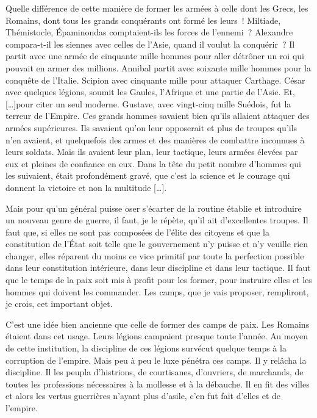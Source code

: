 \documentclass[french,twoside]{book} %
\begin{document}
Quelle différence de cette manière de former les armées à celle dont les Grecs, les Romains, dont tous les grands conquérants ont formé les leurs ! Miltiade, Thémistocle, Épaminondas comptaient-ils les forces de l’ennemi ? Alexandre compara-t-il les siennes avec celles de l’Asie, quand il voulut la conquérir ? Il partit avec une armée de cinquante mille hommes pour aller détrôner un roi qui pouvait en armer des millions. Annibal partit avec soixante mille hommes pour la conquête de l’Italie. Scipion avec cinquante mille pour attaquer Carthage. César avec quelques légions, soumit les Gaules, l’Afrique et une partie de l’Asie. Et, […]pour citer un seul moderne. Gustave, avec vingt-cinq mille Suédois, fut la terreur de l’Empire. Ces grands hommes savaient bien qu’ils allaient attaquer des armées supérieures. Ils savaient qu’on leur opposerait et plus de troupes qu’ils n’en avaient, et quelquefois des armes et des manières de combattre inconnues à leurs soldats. Mais ils avaient leur plan, leur tactique, leurs armées élevées par eux et pleines de confiance en eux. Dans la tête du petit nombre d’hommes qui les suivaient, était profondément gravé, que c’est la science et le courage qui donnent la victoire et non la multitude […].\par
Mais pour qu’un général puisse oser s’écarter de la routine établie et introduire un nouveau genre de guerre, il faut, je le répète, qu’il ait d’excellentes troupes. Il faut que, si elles ne sont pas composées de l’élite des citoyens et que la constitution de l’État soit telle que le gouvernement n’y puisse et n’y veuille rien changer, elles réparent du moins ce vice primitif par toute la perfection possible dans leur constitution intérieure, dans leur discipline et dans leur tactique. Il faut que le temps de la paix soit mis à profit pour les former, pour instruire elles et les hommes qui doivent les commander. Les camps, que je vais proposer, rempliront, je crois, cet important objet.\par
C’est une idée bien ancienne que celle de former des camps de paix. Les Romains étaient dans cet usage. Leurs légions campaient presque toute l’année. Au moyen de cette institution, la discipline de ces légions survécut quelque temps à la corruption de l’empire. Mais peu à peu le luxe pénétra ces camps. Il y relâcha la discipline. Il les peupla d’histrions, de courtisanes, d’ouvriers, de marchands, de toutes les professions nécessaires à la mollesse et à la débauche. Il en fit des villes et alors les vertus guerrières n’ayant plus d’asile, c’en fut fait d’elles et de l’empire.\par
\end{document}
